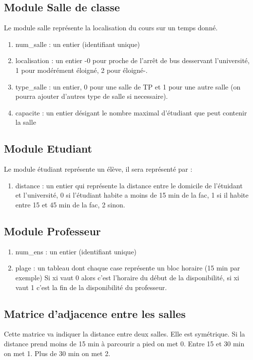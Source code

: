 \documentclass[a4paper,11pt]{article}
\begin{document}
	\subsection{Module Salle de classe}
		Le module salle représente la localisation du cours sur un temps donné.
		\begin{enumerate}
			\item num_salle : un entier (identifiant unique)
			\item localisation : un entier -0 pour proche de l'arrêt de bus desservant l'université, 1 pour modérément éloigné, 2 pour éloigné-. 
			\item type_salle : un entier, 0 pour une salle de TP et 1 pour une autre salle (on pourra ajouter d'autres type de salle si necessaire).
			\item capacite : un entier désigant le nombre maximal d'étudiant que peut contenir la salle
		\end{enumerate}
	\subsection{Module Etudiant}
		Le module étudiant représente un élève, il sera représenté par :
		\begin{enumerate}
			\item distance : un entier qui représente la distance entre le domicile de l'étuidant et l'université, 0 si l'étudiant habite a moins de 15 min de la fac, 1 si il habite entre 15 et 45 min de la fac, 2 sinon.
			\end{enumerate}
	\subsection{Module Professeur}
		\begin{enumerate}
			\item num_ens : un entier (identifiant unique)
			\item plage : un tableau dont chaque case représente un bloc horaire (15 min par exemple)
			Si xi vaut 0 alors c'est l'horaire du début de la disponibilité, si xi vaut 1 c'est la fin de la disponibilité du professeur.
			\end{enumerate}
	\subsection{Matrice d'adjacence entre les salles}
		Cette matrice va indiquer la distance entre deux salles. Elle est symétrique. Si la distance prend moins de 15 min à parcourir a pied on met 0.
		Entre 15 et 30 min on met 1. Plus de 30 min on met 2.
\end{document}

